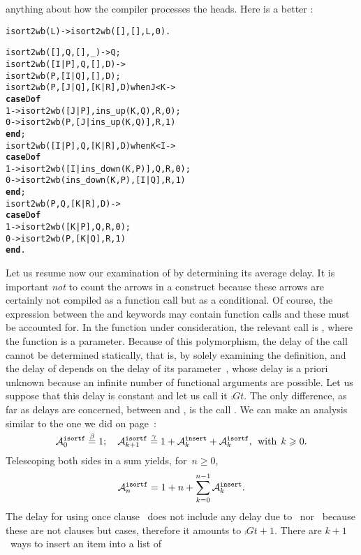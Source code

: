 anything about how the compiler processes the heads. Here is a better
:
\begin{alltt}
isort2wb(L) -> isort2wb([],[],L,0).

isort2wb(   [],    Q,   [],_)            -> Q;
isort2wb([I|P],    Q,   [],D)            ->
\hfill isort2wb(P,[I|Q],[],D);
isort2wb(    P,[J|Q],[K|R],D) when J < K ->
  \textbf{case} D \textbf{of}
    1 -> isort2wb([J|P],    ins_up(K,Q),R,0);
    0 -> isort2wb(    P,[J|ins_up(K,Q)],R,1)
  \textbf{end};
isort2wb([I|P],    Q,[K|R],D) when K < I ->
  \textbf{case} D \textbf{of}
    1 -> isort2wb([I|ins_down(K,P)],    Q,R,0);
    0 -> isort2wb(    ins_down(K,P),[I|Q],R,1)
  \textbf{end};
isort2wb(    P,    Q,[K|R],D)            ->
  \textbf{case} D \textbf{of}
    1 -> isort2wb([K|P],    Q,R,0);
    0 -> isort2wb(    P,[K|Q],R,1)
  \textbf{end}.
\end{alltt}
Let us resume now our examination of  by determining
its average delay. It is important \emph{not} to count the arrows in a
 construct because these arrows are certainly not
compiled as a function call but as a conditional. Of course, the
expression between the  and  keywords may
contain function calls and these must be accounted for. In the
function under consideration, the relevant call is ,
where the function  is a parameter. Because of this
polymorphism, the delay of the call cannot be determined statically,
that is, by solely examining the definition, and the delay of
 depends on the delay of its parameter~,
whose delay is a priori unknown because an infinite number of
functional arguments are possible. Let us suppose that this delay is
constant and let us call it \(\comp{Gt}{}\). The only difference, as
far as delays are concerned, between  and
, is the call . We can make an
analysis similar to the one we did on page~\pageref{def:ave_isort}:
\[
\ave{isortf}{0}   \eqn{\beta} 1;\quad
\ave{isortf}{k+1} \eqn{\gamma} 1 + \ave{insert}{k} +
  \ave{isortf}{k},\,\; \text{with} \;\, k \geqslant 0.
\]
Telescoping both sides in a sum yields, for~\({n \geqslant 0}\),
\[
\ave{isortf}{n} = 1 + n + \sum_{k=0}^{n-1}{\ave{insert}{k}}.
\]
The delay for using once clause~ does not include
any delay due to \clause{\zeta}~nor~\clause{\eta} because these are
not clauses but cases, therefore it amounts to \(\comp{Gt}{} +
1\). There are \(k+1\)~ways to insert an item into a list of
